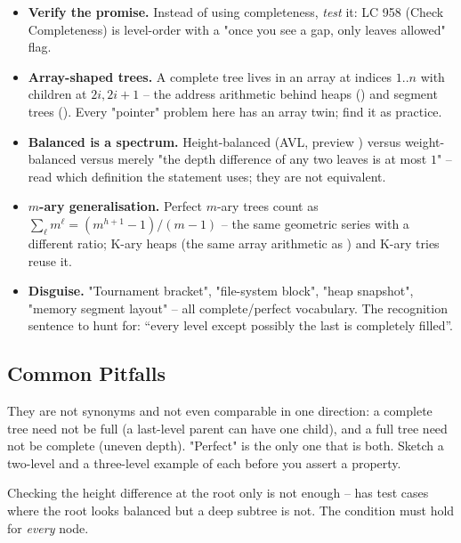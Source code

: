 \begin{itemize}
  \item \textbf{Verify the promise.} Instead of using completeness, \emph{test} it:
        LC 958 (Check Completeness) is level-order with a "once you see a gap, only
        leaves allowed" flag. \hfill{}
  \item \textbf{Array-shaped trees.} A complete tree lives in an array at indices
        $1..n$ with children at $2i,2i+1$ -- the address arithmetic behind heaps
        () and segment trees (). Every "pointer" problem here
        has an array twin; find it as practice. \hfill{}
  \item \textbf{Balanced is a spectrum.} Height-balanced (AVL,  preview
        ) versus weight-balanced versus merely "the depth difference of any
        two leaves is at most $1$" -- read which definition the statement uses; they
        are not equivalent.
        \hfill{}
  \item \textbf{$m$-ary generalisation.} Perfect $m$-ary trees count as
        $\sum_{\ell} m^{\ell} = (m^{h+1}-1)/(m-1)$ -- the same geometric series with a
        different ratio; K-ary heaps (the same array arithmetic as ) and
        K-ary tries reuse it.
        \hfill{}
  \item \textbf{Disguise.} "Tournament bracket", "file-system block", "heap snapshot",
        "memory segment layout" -- all complete/perfect vocabulary. The recognition
        sentence to hunt for: ``every level except possibly the last is completely
        filled''.
\end{itemize}

\subsection{Common Pitfalls}

\begin{warningbox}
They are not synonyms and not even comparable in one direction: a complete tree need not
be full (a last-level parent can have one child), and a full tree need not be complete
(uneven depth). "Perfect" is the only one that is both. Sketch a two-level and a
three-level example of each before you assert a property.
\end{warningbox}

\begin{warningbox}
Checking the height difference at the root only is not enough -- 
has test cases where the root looks balanced but a deep subtree is not. The condition must
hold for \emph{every} node.
\end{warningbox}

